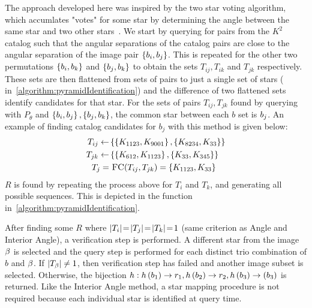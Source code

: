 The approach developed here was inspired by the two star voting algorithm, which accumlates "votes" for some star by
determining the angle between the same star and two other stars~\cite{tichy:preliminaryTestsCommericalImagers}.
We start by querying for pairs from the $K^2$ catalog such that the angular separations of the catalog pairs are
close to the angular separation of the image pair $\left\{ b_i, b_j \right\}$.
This is repeated for the other two permutations $\left\{ b_i, b_k \right\}$ and $\left\{  b_j, b_k  \right\}$ to obtain
the sets $T_{ij}, T_{ik}$ and $T_{jk}$ respectively.
These sets are then flattened from sets of pairs to just a single set of stars (
in~\autoref{algorithm:pyramidIdentification}) and the difference of two flattened sets identify candidates for that
star.
For the sets of pairs $T_{ij}, T_{jk}$ found by querying with $P_\theta$ and $\left\{ b_i, b_j \right\},
\left\{ b_j, b_k \right\}$, the common star between each $b$ set is $b_j$.
An example of finding catalog candidates for $b_j$ with this method is given below:
\begin{equation}
    \begin{aligned}
        T_{ij} \gets& \set{ \set{\vv{K_{1123}}, \vv{K_{9001}}}, \set{\vv{K_{8234}}, \vv{K_{33}}} } \\
        T_{jk} \gets& \set{ \set{\vv{K_{612}}, \vv{K_{1123}}}, \set{\vv{K_{33}}, \vv{K_{345}}} } \\
        T_j =& \  \Call{FC}{T_{ij}, T_{jk}} = \set{\vv{K_{1123}}, \vv{K_{33}}}
    \end{aligned}
\end{equation}
$R$ is found by repeating the process above for $T_i$ and $T_k$, and generating all possible sequences.
This is depicted in the  function in~\autoref{algorithm:pyramidIdentification}.

After finding some $R$ where $\left| T_i \right| \!=\! \left| T_j \right| \!=\! \left| T_k \right| \!=\! 1$ (same criterion as Angle and
Interior Angle), a verification step is performed.
A different star from the image $\beta$ is selected and the query step is performed for each distinct trio
combination of $b$ and $\beta$.
If $\left| T_\beta \right| \neq 1$, then verification step has failed and another image subset is selected.
Otherwise, the bijection $h : h\left(b_1\right) \rightarrow r_1, h\left(b_2\right)
\rightarrow r_2, h\left(b_3\right) \rightarrow(b_3)$ is returned.
Like the Interior Angle method, a star mapping procedure is not required because each individual star is identified
at query time.

